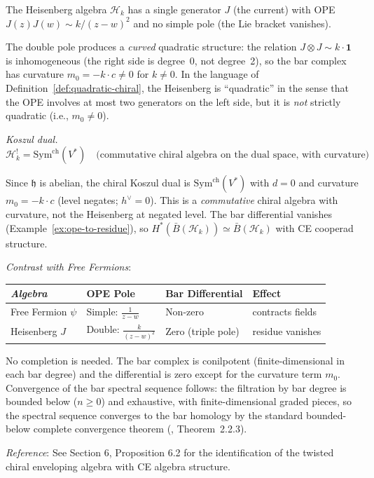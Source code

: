 \begin{example}\label{ex:heisenberg-quadratic}
The Heisenberg algebra $\mathcal{H}_k$ has a single generator $J$ (the current) with OPE $J(z)J(w) \sim k/(z-w)^2$ and no simple pole (the Lie bracket vanishes).

The double pole produces a \emph{curved} quadratic structure: the relation $J \otimes J \sim k \cdot \mathbf{1}$ is inhomogeneous (the right side is degree~0, not degree~2), so the bar complex has curvature $m_0 = -k \cdot c \neq 0$ for $k \neq 0$.  In the language of Definition~\ref{def:quadratic-chiral}, the Heisenberg is ``quadratic'' in the sense that the OPE involves at most two generators on the left side, but it is \emph{not} strictly quadratic (i.e., $m_0 \neq 0$).

\emph{Koszul dual.}
\[\mathcal{H}_k^! = \mathrm{Sym}^{\mathrm{ch}}(V^*) \quad \text{(commutative chiral algebra on the dual space, with curvature)}\]

Since $\mathfrak{h}$ is abelian, the chiral Koszul dual is $\mathrm{Sym}^{\mathrm{ch}}(V^*)$ with $d = 0$ and curvature $m_0 = -k \cdot c$ (level negates; $h^\vee = 0$).  This is a \emph{commutative} chiral algebra with curvature, not the Heisenberg at negated level.  The bar differential vanishes (Example~\ref{ex:ope-to-residue}), so $H^*(\bar{B}(\mathcal{H}_k)) \simeq \bar{B}(\mathcal{H}_k)$ with CE cooperad structure.

\emph{Contrast with Free Fermions}:
\begin{center}
\begin{tabular}{|l|l|l|l|}
\hline
\emph{Algebra} & \textbf{OPE Pole} & \textbf{Bar Differential} & \textbf{Effect} \\
\hline
Free Fermion $\psi$ & Simple: $\frac{1}{z-w}$ & Non-zero & contracts fields \\
Heisenberg $J$ & Double: $\frac{k}{(z-w)^2}$ & Zero (triple pole) & residue vanishes \\
\hline
\end{tabular}
\end{center}

No completion is needed. The bar complex is conilpotent (finite-dimensional in each bar degree) and the differential is zero except for the curvature term $m_0$. Convergence of the bar spectral sequence follows: the filtration by bar degree is bounded below ($n \geq 0$) and exhaustive, with finite-dimensional graded pieces, so the spectral sequence converges to the bar homology by the standard bounded-below complete convergence theorem (\cite{LV12}, Theorem~2.2.3).

\emph{Reference}: See \cite{GLZ22} Section 6, Proposition 6.2 for the identification
of the twisted chiral enveloping algebra with CE algebra structure.
\end{example}

